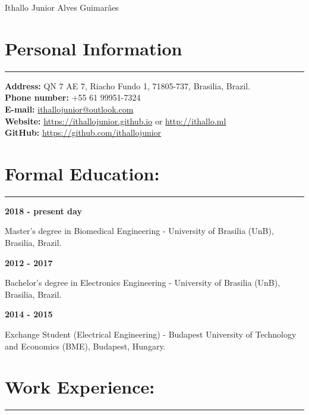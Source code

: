 \documentclass[11pt]{article}
\begin{document}
\begin{center}
\huge{Ithallo Junior Alves Guimarães}
\end{center}

\section{Personal Information}
\hrule \vspace{0.1cm}

\begin{addmargin}{0.5cm}

\textbf{Address:}  QN 7 AE 7, Riacho Fundo 1, 71805-737, Brasilia, Brazil. \\
\textbf{Phone number:}  +55 61 99951-7324 \\
\textbf{E-mail:}   \href{maito:ithallojunior@outlook.com}{ithallojunior@outlook.com} \\
\textbf{Website:}  \url{https://ithallojunior.github.io} or \url{http://ithallo.ml} \\
\textbf{GitHub:} \url{https://github.com/ithallojunior}

\end{addmargin}


\section{Formal Education:}
\hrule \vspace{0.1cm}

\textbf{2018 - present day}
\begin{addmargin}{0.5cm}
Master's degree in Biomedical Engineering - University of Brasilia (UnB), Brasilia, Brazil. \\
\end{addmargin}

\textbf{2012 - 2017}
\begin{addmargin}{0.5cm}
Bachelor's degree in Electronics Engineering - University of Brasilia (UnB), Brasilia, Brazil. \\
\end{addmargin}

\textbf{2014 - 2015} 
\begin{addmargin}{0.5cm}
Exchange Student (Electrical Engineering) - Budapest University of Technology and Economics (BME), Budapest, Hungary. 
\end{addmargin}

\section{Work Experience:}
\hrule \vspace{0.1cm}
\end{document}
